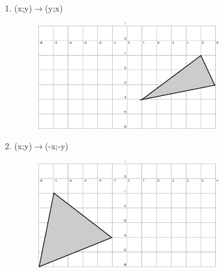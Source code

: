 \begin{enumerate}[noitemsep, label=\textbf{\arabic*}. ]
\begin{enumerate}[noitemsep, label=\textbf{\alph*}. ]
\begin{figure}[H]
\begin{center}
      \vspace{2pt}
    \vspace{.1in}
    \end{center}
 \end{figure}       \label{m39358*uid128}\item (x;y)\begin{math}\to \end{math}(y;x)
    \setcounter{subfigure}{0}
	\begin{figure}[H] %
    \begin{center}
    \label{m39358*id74053!!!underscore!!!media}\label{m39358*id74053!!!underscore!!!printimage}\includegraphics[width=300px]{col11306.imgs/m39358_MG10C14_039.png} %
      \vspace{2pt}
    \vspace{.1in}
    \end{center}
 \end{figure}       \label{m39358*uid129}\item (x;y)\begin{math}\to \end{math}(-x;-y)
    \setcounter{subfigure}{0}
	\begin{figure}[H] %
    \begin{center}
    \label{m39358*id74084!!!underscore!!!media}\label{m39358*id74084!!!underscore!!!printimage}\includegraphics[width=300px]{col11306.imgs/m39358_MG10C14_040.png} %
      \vspace{2pt}

\end{center}
\end{figure}
\end{enumerate}
\end{enumerate}
